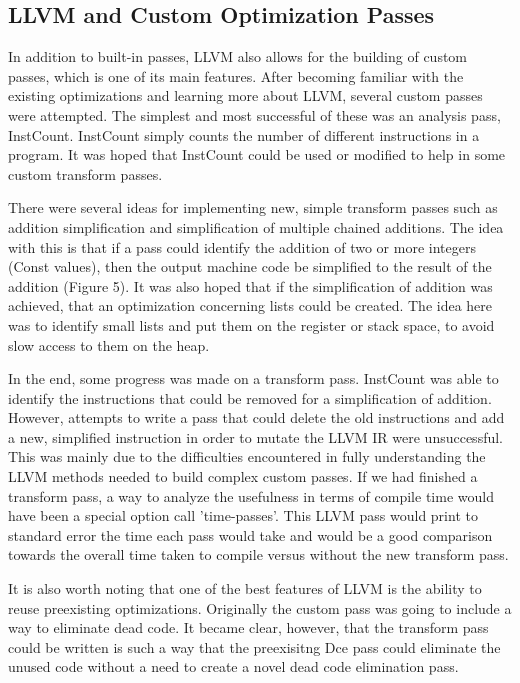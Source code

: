 \subsection{LLVM and Custom Optimization Passes}
 
In addition to built-in passes, LLVM also allows for the building of custom passes, which is one of its main features. After becoming familiar with the existing optimizations and learning more about LLVM, several custom passes were attempted. The simplest and most successful of these was an analysis pass, InstCount. InstCount simply counts the number of different instructions in a program. It was hoped that InstCount could be used or modified to help in some custom transform passes.

There were several ideas for implementing new, simple transform passes such as addition simplification and simplification of multiple chained additions. The idea with this is that if a pass could identify the addition of two or more integers (Const values), then the output machine code be simplified to the result of the addition (Figure 5). It was also hoped that if the simplification of addition was achieved, that an optimization concerning lists could be created. The idea here was to identify small lists and put them on the register or stack space, to avoid slow access to them on the heap.

In the end, some progress was made on a transform pass. InstCount was able to identify the instructions that could be removed for a simplification of addition. However, attempts to write a pass that could delete the old instructions and add a new, simplified instruction in order to mutate the LLVM IR were unsuccessful. This was mainly due to the difficulties encountered in fully understanding  the LLVM methods needed to build complex custom passes.  If we had finished a transform pass, a way to analyze the usefulness in terms of compile time would have been a special option call 'time-passes'. This LLVM pass would print to standard error the time each pass would take and would be a good comparison towards the overall time taken to compile versus without the new transform pass.

It is also worth noting that one of the best features of LLVM is the ability to reuse preexisting optimizations. Originally the custom pass was going to include a way to eliminate dead code. It became clear, however, that the transform pass could be written is such a way that the preexisitng Dce pass could eliminate the unused code without a need to create a novel dead code elimination pass\cite{LLVMIR}.

